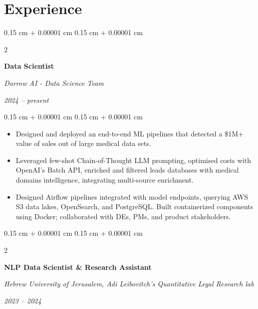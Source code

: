 \documentclass[10pt, letterpaper]{article}
\newenvironment{highlights}{
    \begin{itemize}[
        topsep=0.08 cm,
        parsep=0.08 cm,
        partopsep=0pt,
        itemsep=0pt,
        leftmargin=0.25 cm + 10pt
    ]
}{
    \end{itemize}
} %
\newenvironment{onecolentry}{
    \begin{adjustwidth}{
        0.15 cm + 0.00001 cm
    }{
        0.15 cm + 0.00001 cm
    }
}{
    \end{adjustwidth}
} %
\newenvironment{twocolentry}[2][]{
    \onecolentry
    \def\secondColumn{#2}
    \setcolumnwidth{\fill, 4.5 cm}
    \begin{paracol}{2}
}{
    \switchcolumn \raggedleft \secondColumn
    \end{paracol}
    \endonecolentry
} %
\begin{document}
    \section{Experience}



        
        \begin{twocolentry}{
            
            
        \textit{2024 – present}}
            \textbf{Data Scientist}
            
            \textit{Darrow AI - Data Science Team}
        \end{twocolentry}

        \vspace{0.08 cm}
        \begin{onecolentry}
            \begin{highlights}
                \item Designed and deployed an end-to-end ML pipelines that detected a \$1M+ value of sales out of large medical data sets.
                \item Leveraged few-shot Chain-of-Thought LLM prompting, optimised costs with OpenAI’s Batch API, enriched and filtered leads databases with medical domains intelligence, integrating multi-source enrichment.
                \item Designed Airflow pipelines integrated with model endpoints, querying AWS S3 data lakes, OpenSearch, and PostgreSQL. Built containerized components using Docker; collaborated with DEs, PMs, and product stakeholders.
            \end{highlights}
        \end{onecolentry}


        \vspace{0.15 cm}

        \begin{twocolentry}{
            
            
        \textit{2023 – 2024}}
            \textbf{NLP Data Scientist \& Research Assistant}
            
            \textit{Hebrew University of Jerusalem, Adi Leibovitch's Quantitative Legal Research lab}
        \end{twocolentry}
\end{document}
